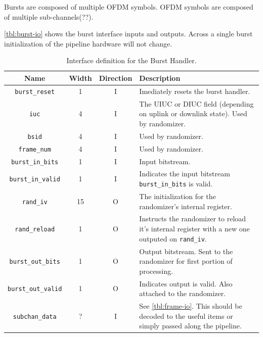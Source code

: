 \documentclass[dvips,10pt,twocolumn]{article}
\begin{document}
Bursts are composed of multiple OFDM symbols. OFDM symbols are composed of
multiple sub-channels(??). 

\autoref{tbl:burst-io} shows the burst interface inputs and outputs.
Across a single burst initialization of the pipeline hardware will not
change.

\begin{table} \begin{tabularx}{\textwidth}{c|c|c|X}
	\label{tbl:burst-io}
	Name & Width & Direction & Description \\ \hline
	
	\texttt{burst\_reset} & 1 & I & Imediately resets the burst handler.
	\\

	\texttt{iuc} & 4 & I & The UIUC or DIUC field (depending on uplink
	or downlink state). Used by randomizer. \\
	
	\texttt{bsid} & 4 & I & Used by randomizer. \\
	
	\texttt{frame\_num} & 4 & I & Used by randomizer. \\

	\texttt{burst\_in\_bits} & 1 & I & Input bitstream. \\

	\texttt{burst\_in\_valid} & 1 &  I & Indicates the input bitstream
	\texttt{burst\_in\_bits} is valid. \\

	\texttt{rand\_iv} & 15 & O & The initialization for
	the randomizer's internal register. \\

	\texttt{rand\_reload} & 1 & O & Instructs the randomizer to reload
	it's internal register with a new one outputed on
	\texttt{rand\_iv}. \\

	\texttt{burst\_out\_bits} & 1 & O & Output bitstream. Sent to the
	randomizer for first portion of processing. \\

	\texttt{burst\_out\_valid} & 1 & O & Indicates output is valid.
	Also attached to the randomizer. \\

	\texttt{subchan\_data} & ? & I & See \autoref{tbl:frame-io}. This
	should be decoded to the useful items or simply passed along the
	pipeline.
\end{tabularx}
\caption{Interface definition for the Burst Handler.}
\end{table}
\end{document}
